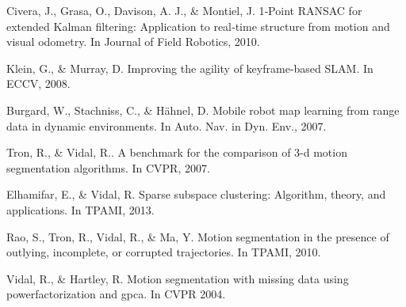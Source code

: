 \documentclass[10pt,twocolumn,letterpaper]{article}  %
\begin{document}





\begin{thebibliography}{99}
 Civera, J., Grasa, O., Davison, A. J., \& Montiel, J. 1‐Point RANSAC for extended Kalman filtering: Application to real‐time structure from motion and visual odometry. In Journal of Field Robotics, 2010.

 Klein, G., \& Murray, D. Improving the agility of keyframe-based SLAM. In ECCV, 2008.

 Burgard, W., Stachniss, C., \& Hähnel, D. Mobile robot map learning from range data in dynamic environments. In Auto. Nav. in Dyn. Env., 2007.

 Tron, R., \& Vidal, R.. A benchmark for the comparison of 3-d motion segmentation algorithms. In CVPR, 2007. 

 Elhamifar, E., \& Vidal, R. Sparse subspace clustering: Algorithm, theory, and applications. In TPAMI, 2013.
%

 Rao, S., Tron, R., Vidal, R., \& Ma, Y. Motion segmentation in the presence of outlying, incomplete, or corrupted trajectories. In TPAMI, 2010.

%

 Vidal, R., \& Hartley, R. Motion segmentation with missing data using powerfactorization and gpca. In CVPR 2004.



%


\end{thebibliography}
\end{document}
